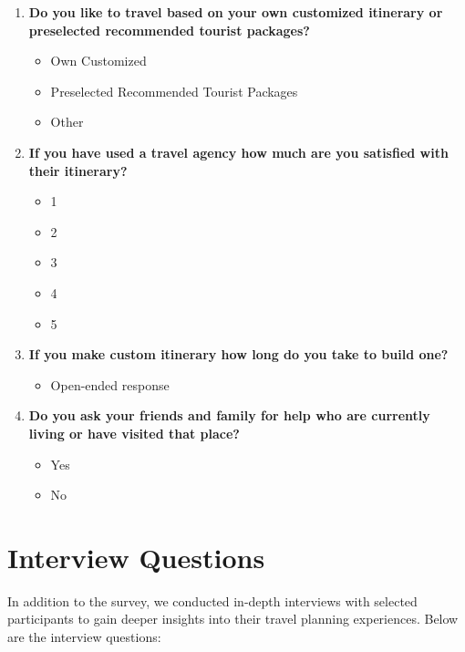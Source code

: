\documentclass[conference]{IEEEtran}
\begin{document}
\begin{enumerate}
        \item \textbf{Do you like to travel based on your own customized itinerary or preselected recommended tourist packages?}
        \begin{itemize}
            \item Own Customized
            \item Preselected Recommended Tourist Packages
            \item Other
        \end{itemize}
        
        \item \textbf{If you have used a travel agency how much are you satisfied with their itinerary?}
        \begin{itemize}
            \item 1
            \item 2
            \item 3
            \item 4
            \item 5
        \end{itemize}
        
        \item \textbf{If you make custom itinerary how long do you take to build one?}
        \begin{itemize}
            \item Open-ended response
        \end{itemize}
        
        \item \textbf{Do you ask your friends and family for help who are currently living or have visited that place?}
        \begin{itemize}
            \item Yes
            \item No
        \end{itemize}
    \end{enumerate}

\section{Interview Questions}
    In addition to the survey, we conducted in-depth interviews with selected participants to gain deeper insights into their travel planning experiences. Below are the interview questions:
\end{document}
